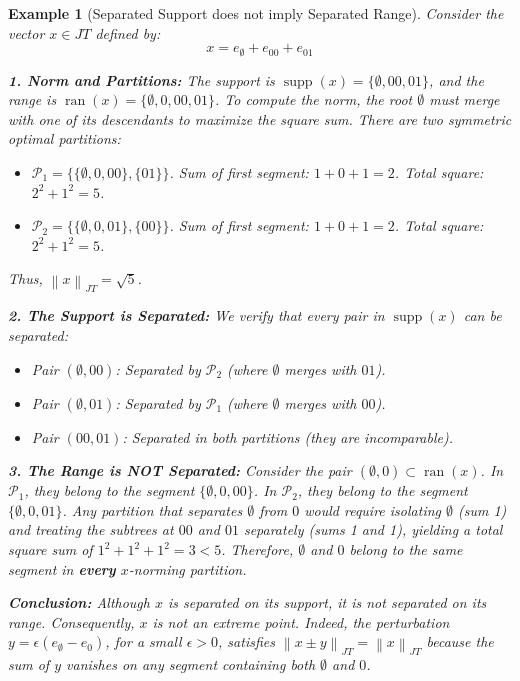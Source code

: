 \documentclass[11pt,a4paper]{amsart}
\newtheorem{example}[theorem]{Example}
\newcommand{\JT}{JT}
\newcommand{\norm}[1]{\left\lVert#1\right\rVert}
\newcommand{\supp}{\operatorname{supp}}
\newcommand{\ran}{\operatorname{ran}}
\begin{document}
\begin{example}[Separated Support does not imply Separated Range]
    Consider the vector $x \in \JT$ defined by:
    \[ x = e_{\emptyset} + e_{00} + e_{01} \]
    
    \textbf{1. Norm and Partitions:}
    The support is $\supp(x) = \{ \emptyset, 00, 01 \}$, and the range is $\ran(x) = \{ \emptyset, 0, 00, 01 \}$.
    To compute the norm, the root $\emptyset$ must merge with one of its descendants to maximize the square sum. There are two symmetric optimal partitions:
    \begin{itemize}
        \item $\mathcal{P}_1 = \{ \{\emptyset, 0, 00\}, \{01\} \}$. 
        Sum of first segment: $1+0+1=2$. Total square: $2^2 + 1^2 = 5$.
        \item $\mathcal{P}_2 = \{ \{\emptyset, 0, 01\}, \{00\} \}$. 
        Sum of first segment: $1+0+1=2$. Total square: $2^2 + 1^2 = 5$.
    \end{itemize}
    Thus, $\norm{x}_{\JT} = \sqrt{5}$.
    
    \textbf{2. The Support is Separated:}
    We verify that every pair in $\supp(x)$ can be separated:
    \begin{itemize}
        \item Pair $(\emptyset, 00)$: Separated by $\mathcal{P}_2$ (where $\emptyset$ merges with $01$).
        \item Pair $(\emptyset, 01)$: Separated by $\mathcal{P}_1$ (where $\emptyset$ merges with $00$).
        \item Pair $(00, 01)$: Separated in both partitions (they are incomparable).
    \end{itemize}
    
    \textbf{3. The Range is NOT Separated:}
    Consider the pair $(\emptyset, 0) \subset \ran(x)$. 
    In $\mathcal{P}_1$, they belong to the segment $\{\emptyset, 0, 00\}$.
    In $\mathcal{P}_2$, they belong to the segment $\{\emptyset, 0, 01\}$.
    Any partition that separates $\emptyset$ from $0$ would require isolating $\emptyset$ (sum 1) and treating the subtrees at $00$ and $01$ separately (sums 1 and 1), yielding a total square sum of $1^2 + 1^2 + 1^2 = 3 < 5$.
    Therefore, $\emptyset$ and $0$ belong to the same segment in \textbf{every} $x$-norming partition.
    
    \textbf{Conclusion:}
    Although $x$ is separated on its support, it is not separated on its range. Consequently, $x$ is not an extreme point. Indeed, the perturbation $y = \epsilon(e_{\emptyset} - e_0)$, for a small $\epsilon > 0$, satisfies $\norm{x \pm y}_{\JT} = \norm{x}_{\JT}$ because the sum of $y$ vanishes on any segment containing both $\emptyset$ and $0$.
\end{example}
\end{document}
